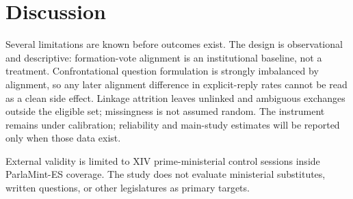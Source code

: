 \section{Discussion}
\label{sec:discussion}


Several limitations are known before outcomes exist. The design is
observational and descriptive: formation-vote alignment is an institutional
baseline, not a treatment. Confrontational question formulation is strongly
imbalanced by alignment, so any later alignment difference in explicit-reply
rates cannot be read as a clean side effect. Linkage attrition leaves
unlinked and ambiguous exchanges outside the eligible set; missingness is not
assumed random. The instrument remains under calibration; reliability and
main-study estimates will be reported only when those data exist.

External validity is limited to XIV prime-ministerial control sessions inside
ParlaMint-ES coverage. The study does not evaluate ministerial substitutes,
written questions, or other legislatures as primary targets.
